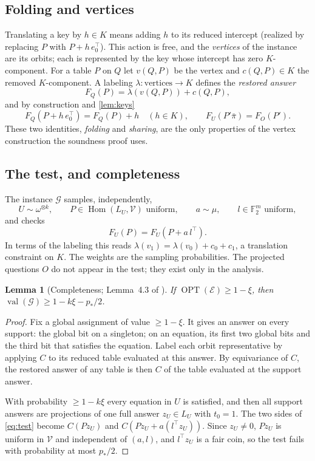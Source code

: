 \documentclass[11pt]{article}
\newtheorem{lemma}[theorem]{Lemma}
\theoremstyle{definition}
\theoremstyle{remark}
\newcommand{\F}{\mathbb F}
\newcommand{\V}{\mathcal V}
\newcommand{\cE}{\mathcal E}
\newcommand{\cG}{\mathcal G}
\newcommand{\bpi}{\bar\pi}
\DeclareMathOperator{\OPT}{OPT}
\DeclareMathOperator{\val}{val}
\DeclareMathOperator{\Hom}{Hom}
\begin{document}
\subsection{Folding and vertices}

Translating a key by $h\in K$ means adding $h$ to its reduced intercept (realized
by replacing $P$ with $P+h\,e_0^\top$). This action is free, and the
\emph{vertices} of the instance are its orbits; each is represented by the key
whose intercept has zero $K$-component. For a table $P$ on $Q$ let $v(Q,P)$ be
the vertex and $c(Q,P)\in K$ the removed $K$-component. A labeling
$\lambda\colon\text{vertices}\to K$ defines the \emph{restored answer}
\[
F_Q(P)=\lambda(v(Q,P))+c(Q,P),
\]
and by construction and \cref{lem:keys}
\begin{equation}\label{eq:fold-share}
F_Q(P+h\,e_0^\top)=F_Q(P)+h\quad(h\in K),\qquad F_U(P'\bpi)=F_O(P').
\end{equation}
These two identities, \emph{folding} and \emph{sharing}, are the only
properties of the vertex construction the soundness proof uses.

\subsection{The test, and completeness}

The instance $\cG$ samples, independently,
\[
U\sim\omega^{\otimes k},\qquad P\in\Hom(L_U,\V)\text{ uniform},\qquad
a\sim\mu,\qquad l\in\F_2^m\text{ uniform},
\]
and checks
\begin{equation}\label{eq:test}
F_U(P)=F_U(P+a\,l^\top).
\end{equation}
In terms of the labeling this reads $\lambda(v_1)=\lambda(v_0)+c_0+c_1$, a
translation constraint on $K$. The weights are the sampling probabilities. The
projected questions $O$ do not appear in the test; they exist only in the
analysis.

\begin{lemma}[Completeness; Lemma~4.3 of \cite{OpenAI-UGC}]\label{lem:complete}
If $\OPT(\cE)\ge1-\xi$, then $\val(\cG)\ge1-k\xi-p_*/2$.
\end{lemma}

\begin{proof}
Fix a global assignment of value $\ge1-\xi$. It gives an answer on every
support: the global bit on a singleton; on an equation, its first two global
bits and the third bit that satisfies the equation. Label each orbit
representative by applying $C$ to its reduced table evaluated at this answer.
By equivariance of $C$, the restored answer of any table is then $C$ of the
table evaluated at the support answer.

With probability $\ge1-k\xi$ every equation in $U$ is satisfied, and then all
support answers are projections of one full answer $z_U\in L_U$ with $t_0=1$.
The two sides of \eqref{eq:test} become $C(Pz_U)$ and
$C(Pz_U+a(l^\top z_U))$. Since $z_U\ne0$, $Pz_U$ is uniform in $\V$ and
independent of $(a,l)$, and $l^\top z_U$ is a fair coin, so the test fails with
probability at most $p_*/2$.
\end{proof}
\end{document}
